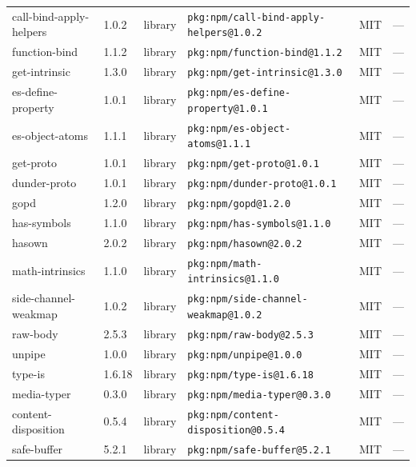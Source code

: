 \documentclass[11pt,a4paper]{article}
\begin{document}
\begin{longtable}{|p{4cm}|p{2cm}|p{1.6cm}|p{5cm}|p{1.5cm}|p{3.5cm}|}
\raggedright call-bind-apply-helpers & 1.0.2 & library & \small\texttt{pkg:npm/call-bind-apply-helpers@1.0.2} & MIT & \small — \\
\raggedright function-bind & 1.1.2 & library & \small\texttt{pkg:npm/function-bind@1.1.2} & MIT & \small — \\
\raggedright get-intrinsic & 1.3.0 & library & \small\texttt{pkg:npm/get-intrinsic@1.3.0} & MIT & \small — \\
\raggedright es-define-property & 1.0.1 & library & \small\texttt{pkg:npm/es-define-property@1.0.1} & MIT & \small — \\
\raggedright es-object-atoms & 1.1.1 & library & \small\texttt{pkg:npm/es-object-atoms@1.1.1} & MIT & \small — \\
\raggedright get-proto & 1.0.1 & library & \small\texttt{pkg:npm/get-proto@1.0.1} & MIT & \small — \\
\raggedright dunder-proto & 1.0.1 & library & \small\texttt{pkg:npm/dunder-proto@1.0.1} & MIT & \small — \\
\raggedright gopd & 1.2.0 & library & \small\texttt{pkg:npm/gopd@1.2.0} & MIT & \small — \\
\raggedright has-symbols & 1.1.0 & library & \small\texttt{pkg:npm/has-symbols@1.1.0} & MIT & \small — \\
\raggedright hasown & 2.0.2 & library & \small\texttt{pkg:npm/hasown@2.0.2} & MIT & \small — \\
\raggedright math-intrinsics & 1.1.0 & library & \small\texttt{pkg:npm/math-intrinsics@1.1.0} & MIT & \small — \\
\raggedright side-channel-weakmap & 1.0.2 & library & \small\texttt{pkg:npm/side-channel-weakmap@1.0.2} & MIT & \small — \\
\raggedright raw-body & 2.5.3 & library & \small\texttt{pkg:npm/raw-body@2.5.3} & MIT & \small — \\
\raggedright unpipe & 1.0.0 & library & \small\texttt{pkg:npm/unpipe@1.0.0} & MIT & \small — \\
\raggedright type-is & 1.6.18 & library & \small\texttt{pkg:npm/type-is@1.6.18} & MIT & \small — \\
\raggedright media-typer & 0.3.0 & library & \small\texttt{pkg:npm/media-typer@0.3.0} & MIT & \small — \\
\raggedright content-disposition & 0.5.4 & library & \small\texttt{pkg:npm/content-disposition@0.5.4} & MIT & \small — \\
\raggedright safe-buffer & 5.2.1 & library & \small\texttt{pkg:npm/safe-buffer@5.2.1} & MIT & \small — \\

\end{longtable}
\end{document}
